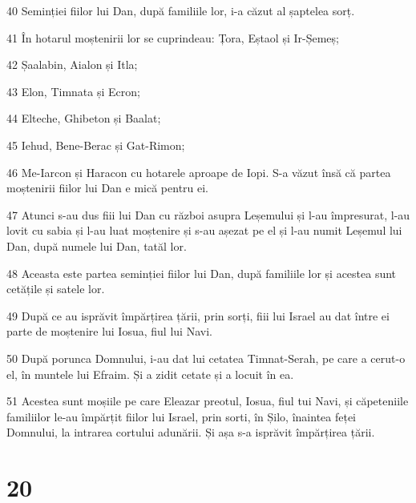 \par 40 Seminției fiilor lui Dan, după familiile lor, i-a căzut al șaptelea sorț.
\par 41 În hotarul moștenirii lor se cuprindeau: Țora, Eștaol și Ir-Șemeș;
\par 42 Șaalabin, Aialon și Itla;
\par 43 Elon, Timnata și Ecron;
\par 44 Elteche, Ghibeton și Baalat;
\par 45 Iehud, Bene-Berac și Gat-Rimon;
\par 46 Me-Iarcon și Haracon cu hotarele aproape de Iopi. S-a văzut însă că partea moștenirii fiilor lui Dan e mică pentru ei.
\par 47 Atunci s-au dus fiii lui Dan cu război asupra Leșemului și l-au împresurat, l-au lovit cu sabia și l-au luat moștenire și s-au așezat pe el și l-au numit Leșemul lui Dan, după numele lui Dan, tatăl lor.
\par 48 Aceasta este partea seminției fiilor lui Dan, după familiile lor și acestea sunt cetățile și satele lor.
\par 49 După ce au isprăvit împărțirea țării, prin sorți, fiii lui Israel au dat între ei parte de moștenire lui Iosua, fiul lui Navi.
\par 50 După porunca Domnului, i-au dat lui cetatea Timnat-Serah, pe care a cerut-o el, în muntele lui Efraim. Și a zidit cetate și a locuit în ea.
\par 51 Acestea sunt moșiile pe care Eleazar preotul, Iosua, fiul tui Navi, și căpeteniile familiilor le-au împărțit fiilor lui Israel, prin sorti, în Șilo, înaintea feței Domnului, la intrarea cortului adunării. Și așa s-a isprăvit împărțirea țării.

\chapter{20}

